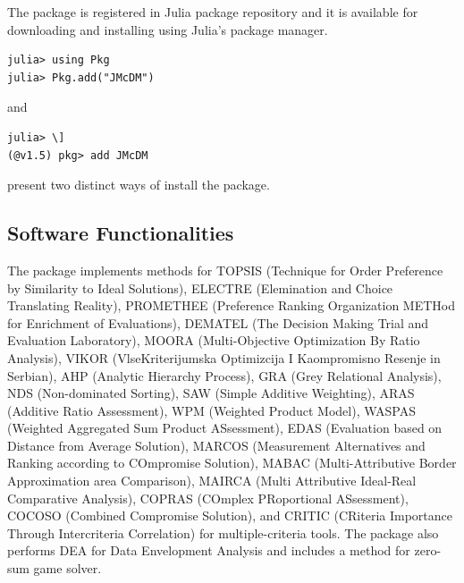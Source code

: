 \documentclass[authoryear,preprint,review,12pt]{elsarticle}
\begin{document}
The package is registered in Julia package repository and it is available for downloading and installing using Julia's package manager.  

\begin{verbatim}
julia> using Pkg
julia> Pkg.add("JMcDM")
\end{verbatim}

\noindent and 

\begin{verbatim}
julia> \]
(@v1.5) pkg> add JMcDM
\end{verbatim}

\noindent present two distinct ways of install the package.


\subsection{Software Functionalities}
\label{}
The package implements methods for 
TOPSIS (Technique for Order Preference by Similarity to Ideal Solutions)\cite{topsis}, 
ELECTRE (Elemination and Choice Translating Reality)\cite{topsis}, 
PROMETHEE (Preference Ranking Organization METHod for Enrichment of Evaluations)\cite{topsis}, 
DEMATEL (The Decision Making Trial and Evaluation Laboratory)\cite{topsis}, 
MOORA (Multi-Objective Optimization By Ratio Analysis)\cite{topsis}, 
VIKOR (VlseKriterijumska Optimizcija I Kaompromisno Resenje in Serbian)\cite{topsis}, 
AHP (Analytic Hierarchy Process)\cite{topsis}, 
GRA (Grey Relational Analysis)\cite{topsis}, 
NDS (Non-dominated Sorting)\cite{topsis}, 
SAW (Simple Additive Weighting)\cite{topsis}, 
ARAS (Additive Ratio Assessment)\cite{topsis}, 
WPM (Weighted Product Model)\cite{topsis}, 
WASPAS (Weighted Aggregated Sum Product ASsessment)\cite{topsis}, 
EDAS (Evaluation based on Distance from Average Solution)\cite{topsis}, 
MARCOS (Measurement Alternatives and Ranking according to COmpromise Solution)\cite{topsis}, 
MABAC (Multi-Attributive Border Approximation area Comparison)\cite{topsis}, 
MAIRCA (Multi Attributive Ideal-Real Comparative Analysis)\cite{topsis}, 
COPRAS (COmplex PRoportional ASsessment)\cite{topisis}, 
COCOSO (Combined Compromise Solution)\cite{topsis}, 
and CRITIC (CRiteria Importance Through Intercriteria Correlation)\cite{topsis} for multiple-criteria tools. The package also performs DEA for Data Envelopment Analysis\cite{Citation_Comes_Here} and includes a method for zero-sum game solver.  
\end{document}
